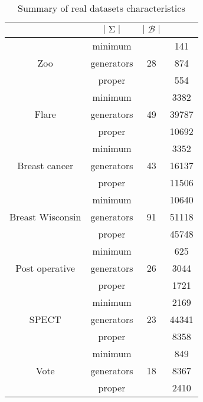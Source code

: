 \documentclass[runningheads]{llncs}
\DeclareMathOperator{\I}{\mathcal{L}}  %
\DeclareMathOperator{\Sg}{\Sigma}  %
\DeclareMathOperator{\B}{\mathcal{B}}
\begin{document}
\begin{table}
	\centering
	\begin{tabular}{| c | c | c | c |}
		\hline \rowcolor{clouds}
		\multicolumn{2}{|c|}{$\I$} & $|\Sg|$ & $|\B|$ \\ \hline
		\multirow{3}{*}{Zoo} & minimum & \multirow{3}{*}{28} & 141 \\
		& generators & & 874 \\
		& proper & & 554 \\ \hline
		
		\multirow{3}{*}{Flare} & minimum & \multirow{3}{*}{49} & 3382 \\
		& generators & & 39787 \\
		& proper & & 10692 \\ \hline
		
		\multirow{3}{*}{Breast cancer} & minimum & \multirow{3}{*}{43} & 3352 \\
		& generators & & 16137 \\
		& proper & & 11506 \\ \hline
		
		\multirow{3}{*}{Breast Wisconsin} & minimum & \multirow{3}{*}{91} & 10640 \\
		& generators & & 51118 \\
		& proper & & 45748 \\ \hline
		
		\multirow{3}{*}{Post operative} & minimum & \multirow{3}{*}{26} & 625 \\
		& generators & & 3044 \\
		& proper & & 1721 \\ \hline
		
		\multirow{3}{*}{SPECT} & minimum & \multirow{3}{*}{23} & 2169 \\
		& generators & & 44341 \\
		& proper & & 8358 \\ \hline
		
		\multirow{3}{*}{Vote} & minimum & \multirow{3}{*}{18} & 849 \\
		& generators & & 8367 \\
		& proper & & 2410 \\ \hline
	\end{tabular}
	\caption{Summary of real datasets characteristics}
	\label{tab:real-DS}
\end{table}
\end{document}
